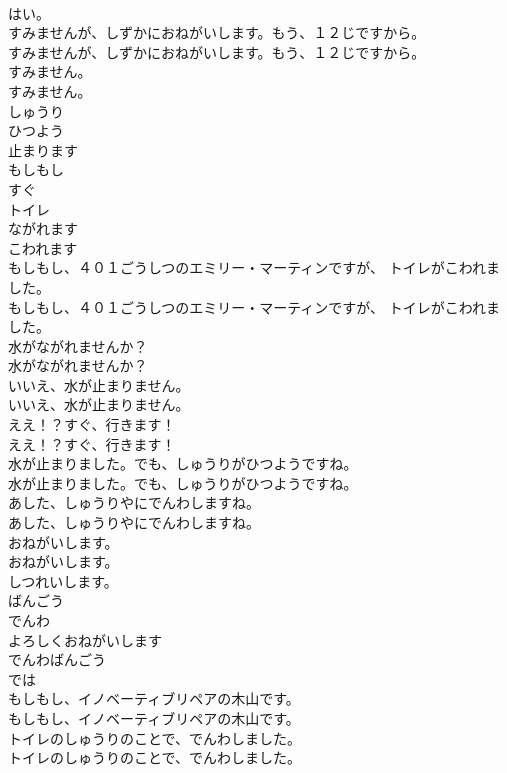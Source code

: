 \documentclass[8pt]{extreport}
\begin{document}
\begin{CJK}{UTF8}{min}
\\	はい。 
\\	すみませんが、しずかにおねがいします。もう、１２じですから。	
\\	すみませんが、しずかにおねがいします。もう、１２じですから。 
\\	すみません。	
\\	すみません。 
\\	しゅうり
\\	ひつよう
\\	止まります
\\	もしもし
\\	すぐ
\\	トイレ
\\	ながれます
\\	こわれます
\\	もしもし、４０１ごうしつのエミリー・マーティンですが、 トイレがこわれました。	
\\	もしもし、４０１ごうしつのエミリー・マーティンですが、 トイレがこわれました。 
\\	水がながれませんか？	
\\	水がながれませんか？ 
\\	いいえ、水が止まりません。	
\\	いいえ、水が止まりません。 
\\	ええ！？すぐ、行きます！	
\\	ええ！？すぐ、行きます！ 
\\	水が止まりました。でも、しゅうりがひつようですね。	
\\	水が止まりました。でも、しゅうりがひつようですね。 
\\	あした、しゅうりやにでんわしますね。	
\\	あした、しゅうりやにでんわしますね。 
\\	おねがいします。	
\\	おねがいします。 
\\	しつれいします。
\\	ばんごう
\\	でんわ
\\	よろしくおねがいします
\\	でんわばんごう
\\	では
\\	もしもし、イノベーティブリペアの木山です。	
\\	もしもし、イノベーティブリペアの木山です。 
\\	トイレのしゅうりのことで、でんわしました。	
\\	トイレのしゅうりのことで、でんわしました。 

\end{CJK}
\end{document}
